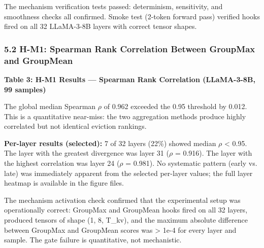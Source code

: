 The mechanism verification tests passed: determinism, sensitivity, and smoothness checks all confirmed. Smoke test (2-token forward pass) verified hooks fired on all 32 LLaMA-3-8B layers with correct tensor shapes.

\subsubsection{5.2 H-M1: Spearman Rank Correlation Between GroupMax and GroupMean}

\textbf{Table 3: H-M1 Results --- Spearman Rank Correlation (LLaMA-3-8B, 99 samples)}

\begin{table}[htbp]
\centering
{}
\end{table}

The global median Spearman $\rho$ of 0.962 exceeded the 0.95 threshold by 0.012. This is a quantitative near-miss: the two aggregation methods produce highly correlated but not identical eviction rankings.

\textbf{Per-layer results (selected):} 7 of 32 layers (22\%) showed median $\rho$ < 0.95. The layer with the greatest divergence was layer 31 ($\rho$ = 0.916). The layer with the highest correlation was layer 24 ($\rho$ = 0.981). No systematic pattern (early vs. late) was immediately apparent from the selected per-layer values; the full layer heatmap is available in the figure files.

The mechanism activation check confirmed that the experimental setup was operationally correct: GroupMax and GroupMean hooks fired on all 32 layers, produced tensors of shape (1, 8, T\_kv), and the maximum absolute difference between GroupMax and GroupMean scores was > 1e-4 for every layer and sample. The gate failure is quantitative, not mechanistic.

